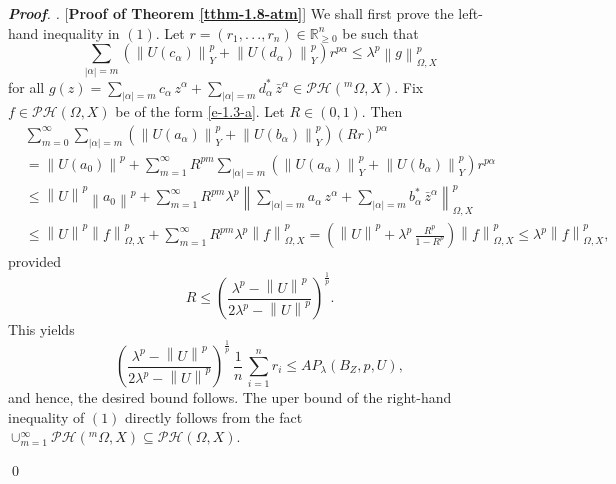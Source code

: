 \documentclass[a4paper,11pt, reqno]{amsart}
\theoremstyle{definition}
\newenvironment{pf}[1][]{%
	\vskip 3mm
	\noindent
	\ifthenelse{\equal{#1}{}}%
	{{\slshape {\bf Proof}. }}%
	{{\slshape #1.} }%
}%
{\qed\bigskip}
\newcommand{\norm}[1]{\left\lVert#1\right\rVert}
\begin{document}
\begin{pf} [{\bf Proof of Theorem \ref{tthm-1.8-atm}}]
	We shall first prove the left-hand inequality in $(1)$. Let $r=(r_1,.\,.\,., r_n)\in \mathbb{R}^n_{\geq 0}$ be such that 
	\begin{equation*}
		\sum_{|\alpha|=m} (\norm{U(c_{\alpha})}^p_{Y} + \norm{U(d_{\alpha})}^p_{Y})r^{p \alpha} \leq \lambda^{p} \norm{g}^p_{\Omega, X}	
	\end{equation*}
	for all $g(z)=\sum_{|\alpha|=m} c_{\alpha}\, z^{\alpha} +  \sum_{|\alpha|=m} d^{*}_{\alpha}\, \bar{z}^{\alpha}\in \mathcal{PH}(^m\Omega,X)$. Fix $f\in \mathcal{PH}(\Omega,X)$ be of the form \eqref{e-1.3-a}. Let $R \in (0,1)$. Then 
	\begin{align} \label{ee-1.5-atm}
		&\sum_{m=0}^{\infty} \sum_{|\alpha|=m} (\norm{U(a_{\alpha})}^p_{Y} + \norm{U(b_{\alpha})}^p_{Y})(Rr)^{p \alpha}  \nonumber\\
		&= \norm{U(a_{0})}^p +  \sum_{m=1}^{\infty} R^{pm}\sum_{|\alpha|=m} (\norm{U(a_{\alpha})}^p_{Y} + \norm{U(b_{\alpha})}^p_{Y})r^{p \alpha} \nonumber\\ 
		& \leq \norm{U}^p \norm{a_{0}}^p +  \sum_{m=1}^{\infty} R^{pm} \lambda^{p} \norm{\sum_{|\alpha|=m} a_{\alpha}\, z^{\alpha} +  \sum_{|\alpha|=m} b^{*}_{\alpha}\, \bar{z}^{\alpha}}^p_{\Omega,X} \\
		&\leq \norm{U}^p \norm{f}^p _{\Omega,X} + \sum_{m=1}^{\infty} R^{pm} \lambda^{p} \norm{f}^p _{\Omega,X}= \left(\norm{U}^p + \lambda^p\, \frac{R^p}{1-R^p}\right) \norm{f}^p _{\Omega,X} \leq \lambda^p \norm{f}^p _{\Omega,X} ,\nonumber
	\end{align}
	provided 
	$$R \leq \left(\frac{\lambda^p - \norm{U}^p}{2\lambda^p - \norm{U}^p}\right)^{\frac{1}{p}}.$$ This yields
	\begin{equation*}
		\left(\frac{\lambda^p - \norm{U}^p}{2\lambda^p - \norm{U}^p}\right)^{\frac{1}{p}} \, \frac{1}{n} \, \sum_{i=1}^{n} r_{i} \leq AP_{\lambda}(B_{Z}, p,U),
	\end{equation*}
	and hence, the desired bound follows. The uper bound of the right-hand inequality of $(1)$ directly follows from the fact $\cup^{\infty}_{m=1} \mathcal{PH}(^m \Omega,X) \subseteq \mathcal{PH}(\Omega,X)$.
	\vspace{1mm}
	

\end{pf}
\end{document}
